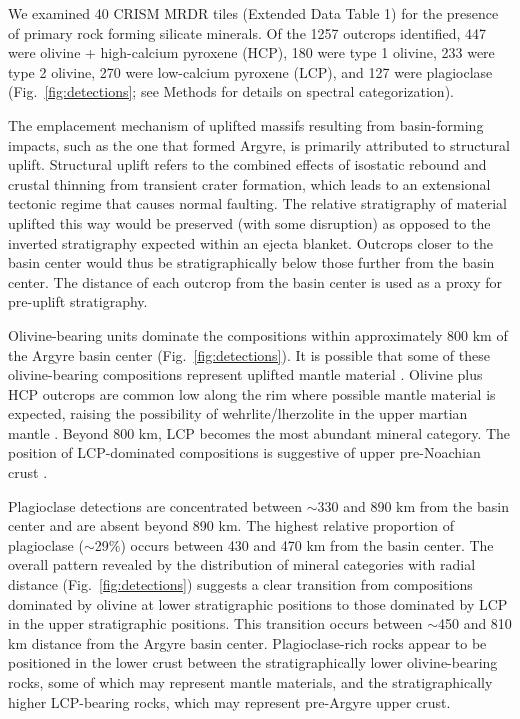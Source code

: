 \documentclass[11pt]{article}
\begin{document}
We examined 40 CRISM MRDR tiles (Extended Data Table 1) for the presence of primary rock forming silicate minerals. Of the 1257 outcrops identified, 447 were olivine + high-calcium pyroxene (HCP), 180 were type 1 olivine, 233 were type 2 olivine, 270 were low-calcium pyroxene (LCP), and 127 were plagioclase (Fig.~\ref{fig:detections}; see Methods for details on spectral categorization).

The emplacement mechanism of uplifted massifs resulting from basin-forming impacts, such as the one that formed Argyre, is primarily attributed to structural uplift. Structural uplift refers to the combined effects of isostatic rebound and crustal thinning from transient crater formation, which leads to an extensional tectonic regime that causes normal faulting. The relative stratigraphy of material uplifted this way would be preserved (with some disruption) as opposed to the inverted stratigraphy expected within an ejecta blanket. Outcrops closer to the basin center would thus be stratigraphically below those further from the basin center. The distance of each outcrop from the basin center is used as a proxy for pre-uplift stratigraphy.

Olivine-bearing units dominate the compositions within approximately 800 km of the Argyre basin center (Fig.~\ref{fig:detections}). It is possible that some of these olivine-bearing compositions represent uplifted mantle material \citep{Koeppen2008, Ody2013}. Olivine plus HCP outcrops are common low along the rim where possible mantle material is expected, raising the possibility of wehrlite/lherzolite in the upper martian mantle \citep{McGetchin1978, Treiman2025, Bernadet2025}. Beyond 800 km, LCP becomes the most abundant mineral category. The position of LCP-dominated compositions is suggestive of upper pre-Noachian crust \citep{Buczkowski2010, McNeil2025}.

Plagioclase detections are concentrated between $\sim$330 and 890 km from the basin center and are absent beyond 890 km. The highest relative proportion of plagioclase ($\sim$29\%) occurs between 430 and 470 km from the basin center. The overall pattern revealed by the distribution of mineral categories with radial distance (Fig.~\ref{fig:detections}) suggests a clear transition from compositions dominated by olivine at lower stratigraphic positions to those dominated by LCP in the upper stratigraphic positions. This transition occurs between $\sim$450 and 810 km distance from the Argyre basin center. Plagioclase-rich rocks appear to be positioned in the lower crust between the stratigraphically lower olivine-bearing rocks, some of which may represent mantle materials, and the stratigraphically higher LCP-bearing rocks, which may represent pre-Argyre upper crust.
\end{document}
